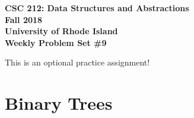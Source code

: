 \documentclass[11pt]{article}
\begin{document}
    \thispagestyle{empty}
    
    \begin{center}
        {\Large\bf CSC 212: Data Structures and Abstractions}\\
        \medskip
        {\Large\bf Fall 2018}\\
        \medskip
        {\Large\bf University of Rhode Island}\\
        \bigskip
        {\Large\bf Weekly Problem Set \#9}
    \end{center}
    
    This is an optional practice assignment!
    \section{Binary Trees}
\end{document}

